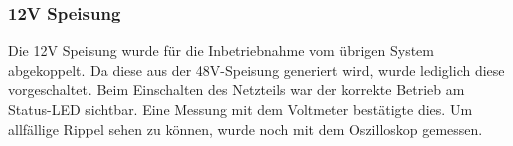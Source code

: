 \subsubsection{12V Speisung}
\label{subsubsec:Inbetriebnahme_12V_Speisungen}

Die 12V Speisung wurde für die Inbetriebnahme vom übrigen System abgekoppelt. Da diese aus der 48V-Speisung generiert wird, wurde lediglich diese vorgeschaltet. Beim Einschalten des Netzteils war der korrekte Betrieb am Status-LED sichtbar. Eine Messung mit dem Voltmeter bestätigte dies. Um allfällige Rippel sehen zu können, wurde noch mit dem Oszilloskop gemessen.

